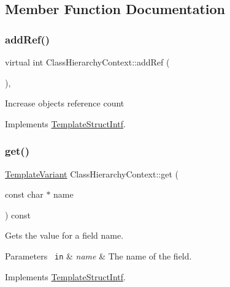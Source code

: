 \subsection{Member Function Documentation}
\mbox{\label{class_class_hierarchy_context_a3140454536d10f2fed6b11f911a8eb0a}} 
\subsubsection{\texorpdfstring{addRef()}{addRef()}}
{\footnotesize\ttfamily virtual int Class\+Hierarchy\+Context\+::add\+Ref (\begin{DoxyParamCaption}{ }\end{DoxyParamCaption})\hspace{0.3cm}{\ttfamily [inline]}, {\ttfamily [virtual]}}

Increase object\textquotesingle{}s reference count 

Implements \mbox{\hyperlink{class_template_struct_intf_a05fe97ad47633beb326f69686faed581}{Template\+Struct\+Intf}}.

\mbox{\label{class_class_hierarchy_context_aac62b85d0f11f149612cd42891e94f07}} 
\subsubsection{\texorpdfstring{get()}{get()}}
{\footnotesize\ttfamily \mbox{\hyperlink{class_template_variant}{Template\+Variant}} Class\+Hierarchy\+Context\+::get (\begin{DoxyParamCaption}\item[{const char $\ast$}]{name }\end{DoxyParamCaption}) const\hspace{0.3cm}{\ttfamily [virtual]}}

Gets the value for a field name. 
\begin{DoxyParams}[1]{Parameters}
\mbox{\texttt{ in}}  & {\em name} & The name of the field. \\
\hline
\end{DoxyParams}


Implements \mbox{\hyperlink{class_template_struct_intf_a3d610cb81b4adbb531ebed3aa3d09b51}{Template\+Struct\+Intf}}.

